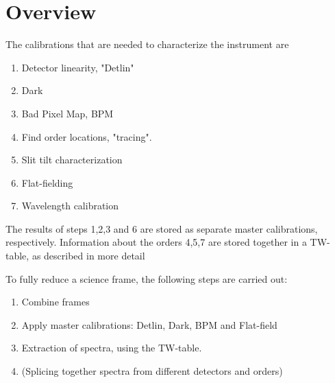 \section{Overview}
\label{sec:overview}

The calibrations that are needed to characterize the instrument are
\begin{enumerate}
    \item Detector linearity, "Detlin"
    \item Dark
    \item Bad Pixel Map, BPM
    \item Find order locations, "tracing".
    \item Slit tilt characterization
    \item Flat-fielding
    \item Wavelength calibration
\end{enumerate} 

The results of steps 1,2,3 and 6 are stored as separate master calibrations, respectively. Information about the orders 4,5,7 are stored together in a TW-table, as described in more detail %

To fully reduce a science frame, the following steps are carried out:
\begin{enumerate}
    \item Combine frames
    \item Apply master calibrations: Detlin, Dark, BPM and Flat-field
    \item Extraction of spectra, using the TW-table.
    \item (Splicing together spectra from different detectors and orders)
\end{enumerate}